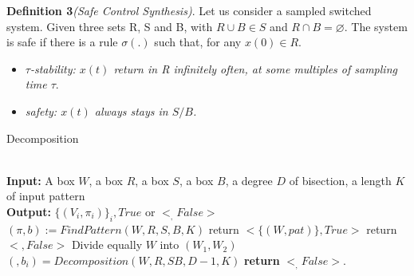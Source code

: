     \textbf{Definition 3}\emph{(Safe Control Synthesis)}. Let us 
    consider a sampled switched system. Given three sets R, S and B, 
    with ${R \cup B \in S}$  and ${R \cap B = \varnothing }$. %
    The system is safe if there is a rule ${\sigma(.)}$ such that, 
    for any ${x(0) \in R }$. 

    \begin{itemize}
        \item \emph{ ${\tau}$-stability: ${x(t)}$ return in R 
        infinitely often, at some multiples of sampling time ${\tau}$}.
        \item \emph{ safety: ${x(t)}$ always stays in ${S/B}$.}        
    \end{itemize}

    \begin{algorithm}    
        \caption{Decomposition}\label{decomposition}    
        \begin{algorithmic}[1]
           \\
            \textbf{Input:} A box $W$, a box $R$, 
            a box $S$, a box $B$, a degree $D$ of bisection, a length $K$ of input pattern\\
            \textbf{Output:} $ \lbrace(V_i,\pi_i)\rbrace_i, True $ or $ <_,False>$ \\          
            $(\pi,b) := FindPattern(W,R,S,B,K)$
              \State return $<\lbrace (W,pat) \rbrace,True>$
            \Else
                \State return $<,False>$
              \Else
                \State Divide equally $W$ into $(W_1,W_2)$
                  \State $(,b_i) = Decomposition(W,R,SB,D-1,K)$
                \EndFor
              \EndIf
            \EndIf
            \State \textbf{return} $<_,False>$.
          \EndProcedure    
        \end{algorithmic}
      \end{algorithm}


